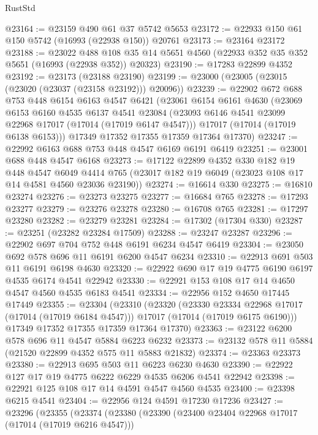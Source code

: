 \begin{lexlean}{RustStd}
\begin{coremodule}
{\begin{coremodule}
{{{{{{{{{{{{{{{{{{{{{{{{{{{{{{{{{{{{{{{{{{{{{{{{{{{{{{{@23164 := @23159 @490 @61 @37 @5742 @5653
@23172 := @22933 @150 @61 @150 @5742 (@16993 (@22938 @150)) @20761
@23173 := @23164 @23172
@23188 := @23022
    @488
    @108
    @35
    @14
    @5651
    @4560
    (@22933 @352 @35 @352 @5651 (@16993 (@22938 @352)) @20323)
@23190 := @17283 @22899 @4352
@23192 := @23173 (@23188 @23190)
@23199 := @23000 (@23005 (@23015 (@23020 (@23037 (@23158 @23192))) @20096))
@23239 := @22902
    @672
    @688
    @753
    @448
    @6154
    @6163
    @4547
    @6421
    (@23061
      @6154
      @6161
      @4630
      (@23069
        @6153
        @6160
        @4535
        @6137
        @4541
        @23084
        (@23093 @6146 @4541 @23099 @22968 @17017 (@17014 (@17019 @6147 @4547)))
        @17017
        (@17014 (@17019 @6138 @6153)))
      @17349
      @17352
      @17355
      @17359
      @17364
      @17370)
@23247 := @22992 @6163 @688 @753 @448 @4547 @6169 @6191 @6419
@23251 := @23001 @688 @448 @4547 @6168
@23273 := @17122
    @22899
    @4352
    @330
    @182
    @19
    @448
    @4547
    @6049
    @4414
    @765
    (@23017 @182 @19 @6049 (@23023 @108 @17 @14 @4581 @4560 @23036 @23190))
@23274 := @16614 @330
@23275 := @16810 @23274
@23276 := @23273 @23275
@23277 := @16684 @765
@23278 := @17293 @23277
@23279 := @23276 @23278
@23280 := @16708 @765
@23281 := @17297 @23280
@23282 := @23279 @23281
@23284 := @17302 (@17304 @330)
@23287 := @23251 (@23282 @23284 @17509)
@23288 := @23247 @23287
@23296 := @22902 @697 @704 @752 @448 @6191 @6234 @4547 @6419
@23304 := @23050 @692 @578 @696 @11 @6191 @6200 @4547 @6234
@23310 := @22913 @691 @503 @11 @6191 @6198 @4630
@23320 := @22922 @690 @17 @19 @4775 @6190 @6197 @4535 @6174 @4541 @22942
@23330 := @22921 @153 @108 @17 @14 @4650 @4547 @4560 @4535 @6183 @4541
@23334 := @22956 @152 @4650 @17445 @17449
@23355 := @23304
    (@23310
      (@23320
        (@23330 @23334 @22968 @17017 (@17014 (@17019 @6184 @4547)))
        @17017
        (@17014 (@17019 @6175 @6190)))
      @17349
      @17352
      @17355
      @17359
      @17364
      @17370)
@23363 := @23122 @6200 @578 @696 @11 @4547 @5884 @6223 @6232
@23373 := @23132 @578 @11 @5884 (@21520 @22899 @4352 @575 @11 @5883 @21832)
@23374 := @23363 @23373
@23380 := @22913 @695 @503 @11 @6223 @6230 @4630
@23390 := @22922 @127 @17 @19 @4775 @6222 @6229 @4535 @6206 @4541 @22942
@23398 := @22921 @125 @108 @17 @14 @4591 @4547 @4560 @4535
@23400 := @23398 @6215 @4541
@23404 := @22956 @124 @4591 @17230 @17236
@23427 := @23296
    (@23355
      (@23374
        (@23380
          (@23390
            (@23400 @23404 @22968 @17017 (@17014 (@17019 @6216 @4547)))
}}}}}}}}}}}}}}}}}}}}}}}}}}}}}}}}}}}}}}}}}}}}}}}}}}}}}}}
\end{coremodule}}
\end{coremodule}
\end{lexlean}
